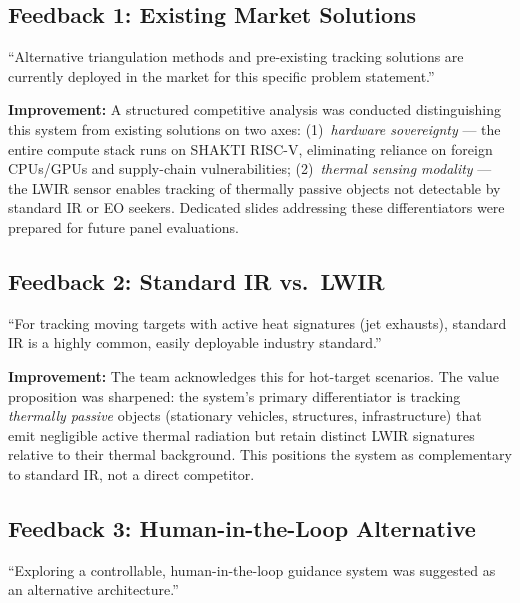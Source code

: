 \documentclass[12pt,a4paper]{article}
\begin{document}
\subsection{Feedback 1: Existing Market Solutions}

\begin{feedbackbox}
``Alternative triangulation methods and pre-existing tracking solutions are currently deployed in the market for this specific problem statement.''
\end{feedbackbox}

\textbf{Improvement:} A structured competitive analysis was conducted distinguishing this system from existing solutions on two axes: (1)~\textit{hardware sovereignty} --- the entire compute stack runs on SHAKTI RISC-V, eliminating reliance on foreign CPUs/GPUs and supply-chain vulnerabilities; (2)~\textit{thermal sensing modality} --- the LWIR sensor enables tracking of thermally passive objects not detectable by standard IR or EO seekers. Dedicated slides addressing these differentiators were prepared for future panel evaluations.

\subsection{Feedback 2: Standard IR vs.\ LWIR}

\begin{feedbackbox}
``For tracking moving targets with active heat signatures (jet exhausts), standard IR is a highly common, easily deployable industry standard.''
\end{feedbackbox}

\textbf{Improvement:} The team acknowledges this for hot-target scenarios. The value proposition was sharpened: the system's primary differentiator is tracking \textit{thermally passive} objects (stationary vehicles, structures, infrastructure) that emit negligible active thermal radiation but retain distinct LWIR signatures relative to their thermal background. This positions the system as complementary to standard IR, not a direct competitor.

\subsection{Feedback 3: Human-in-the-Loop Alternative}

\begin{feedbackbox}
``Exploring a controllable, human-in-the-loop guidance system was suggested as an alternative architecture.''
\end{feedbackbox}
\end{document}
